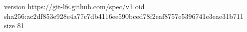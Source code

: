 version https://git-lfs.github.com/spec/v1
oid sha256:ac2df853e928e4a77c7db4116ee590bced78f2eaf8757e5396741e3eae31b711
size 81
